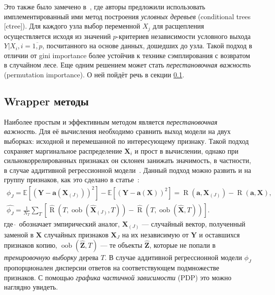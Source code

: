 \documentclass[12pt]{article}
\begin{document}
Это также было замечено в~\citep{bias_rf}, где авторы предложили использовать имплементированный ими метод построения \emph{условных деревьев} (conditional trees [ctree]). Для каждого узла выбор переменной $X_j$ для расщепления осуществляется исходя из значений $p$-критериев независимости условного выхода $Y | X_i, i=\overline{1, p}$, посчитанного на основе данных, дошедших до узла. Такой подход в отличии от gini importance более устойчив к технике сэмплирования с возвратом в случайном лесе. Еще одним решением может стать \emph{перестановочная важность} (permutation importance). О ней пойдёт речь в секции \ref{wrap}.

\subsection{Wrapper методы}\label{wrap}
Наиболее простым и эффективным методом является \emph{перестановочная важность}. Для её вычисления необходимо сравнить выход модели на двух выборках: исходной и перемешанной по интересующему признаку. Такой подход сохраняет маргинальное распределение $\mathbf{X}_i$ и прост в вычислении, однако при сильнокоррелированных признаках он склонен занижать значимость, в частности, в случае аддитивной регрессионной модели~\citep{group_rf_2}. Данный подход можно развить и на группу признаков, как это сделано в статье~\citep{group_rf}:
\begin{gather*}
    \phi_{J}=\mathbb{E}\left[\left(\mathbf{Y}-\mathbf{a}\left(\mathbf{X}_{(J)}\right)\right)^{2}\right]-\mathbb{E}\left[(\mathbf{Y}-\mathbf{a}(\mathbf{X}))^{2}\right] = \operatorname{R}(\mathbf{a}, \mathbf{X}_{(J)}) - \operatorname{R}(\mathbf{a}, \mathbf{X}),\\
    \hat{\phi_{J}}=\frac{1}{N_{T}} \sum_{T}\left[\hat{\operatorname{R}}\left(T, \operatorname{oob}(\mathbf{\hat{X}}_{(J)}, T)\right)-\hat{\operatorname{R}}\left(T, \operatorname{oob}(\mathbf{\hat{X}}, T)\right)\right].
\end{gather*}
где $\hat{~}$ обозначает эмпирический аналог, $\mathbf{X}_{(J)}$ --- случайный вектор, полученный заменой в $\mathbf{X}$ случайных признаков $\mathbf{X}_{J}$ на их независимую от $\mathbf{Y}$ и оставшихся признаков копию, \hspace{1em} $\operatorname{oob}(\mathbf{\hat{Z}}, T)$ --- те объекты $\mathbf{\hat{Z}}$, которые не попали в \emph{тренировочную выборку} дерева $T$. В случае аддитивной регрессионной модели $\phi_{J}$ пропорционален дисперсии ответов на соответствующем подмножестве признаков. С помощью \emph{графика частичной зависимости} (PDP) это можно наглядно увидеть.
\end{document}
